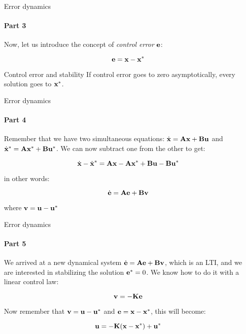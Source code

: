 \documentclass{beamer}
\begin{document}
\begin{frame}{Error dynamics}
\framesubtitle{Part 3}
\begin{flushleft}

Now, let us introduce the concept of \emph{control error} $\mathbf{e}$:

\begin{equation}
    \mathbf{e} = \mathbf{x} - \mathbf{x}^*
\end{equation}

\begin{block}{Control error and stability}
If control error goes to zero asymptotically, every solution goes to $\mathbf{x}^*$.
\end{block}

\end{flushleft}
\end{frame}





\begin{frame}{Error dynamics}
\framesubtitle{Part 4}
\begin{flushleft}

Remember that we have two simultaneous equations: $\dot{\mathbf{x}} = \mathbf{A}\mathbf{x} + \mathbf{B}\mathbf{u}$ and $\dot{\mathbf{x}}^* = \mathbf{A}\mathbf{x}^* + \mathbf{B}\mathbf{u}^*$. We can now subtract one from the other to get:

\begin{equation}
    \dot{\mathbf{x}} - \dot{\mathbf{x}}^* = \mathbf{A}\mathbf{x} - \mathbf{A}\mathbf{x}^* + \mathbf{B}\mathbf{u} - \mathbf{B}\mathbf{u}^*
\end{equation}

in other words:

\begin{equation}
    \dot{\mathbf{e}} = \mathbf{A}\mathbf{e} + \mathbf{B}\mathbf{v}
\end{equation}

where $\mathbf{v} = \mathbf{u} - \mathbf{u}^*$

\end{flushleft}
\end{frame}




\begin{frame}{Error dynamics}
\framesubtitle{Part 5}
\begin{flushleft}

We arrived at a new dynamical system $\dot{\mathbf{e}} = \mathbf{A}\mathbf{e} + \mathbf{B}\mathbf{v}$, which is an LTI, and we are interested in stabilizing the solution $\mathbf{e}^* = 0$. We know how to do it with a linear control law:

\begin{equation}
    \mathbf{v} = -\mathbf{K}\mathbf{e}
\end{equation}

Now remember that $\mathbf{v} = \mathbf{u} - \mathbf{u}^*$ and $\mathbf{e} = \mathbf{x} - \mathbf{x}^*$, this will become:

\begin{equation}
    \mathbf{u} = -\mathbf{K}(\mathbf{x} - \mathbf{x}^*) + \mathbf{u}^*
\end{equation}

\end{flushleft}
\end{frame}
\end{document}
